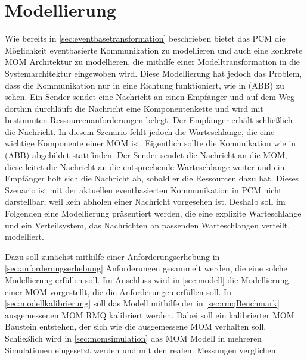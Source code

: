 
\chapter{Modellierung}
\label{ch:modellierung}
Wie bereits in \autoref{sec:eventbasetransformation} beschrieben bietet das PCM die Möglichkeit eventbasierte Kommunikation zu modellieren und auch eine konkrete MOM Architektur zu modellieren, die mithilfe einer Modelltransformation in die Systemarchitektur eingewoben wird. Diese Modellierung hat jedoch das Problem, dass die Kommunikation nur in eine Richtung funktioniert, wie in (ABB) zu sehen. Ein Sender sendet eine Nachricht an einen Empfänger und auf dem Weg dorthin durchläuft die Nachricht eine Komponentenkette und wird mit bestimmten Ressourcenanforderungen belegt. Der Empfänger erhält schließlich die Nachricht. In diesem Szenario fehlt jedoch die Warteschlange, die eine wichtige Komponente einer MOM ist. Eigentlich sollte die Komunikation wie in (ABB) abgebildet stattfinden. Der Sender sendet die Nachricht an die MOM, diese leitet die Nachricht an die entsprechende Warteschlange weiter und ein Empfänger holt sich die Nachricht ab, sobald er die Ressourcen dazu hat. Dieses Szenario ist mit der aktuellen eventbasierten Kommunikation in PCM nicht darstellbar, weil kein abholen einer Nachricht vorgesehen ist. Deshalb soll im Folgenden eine Modellierung präsentiert werden, die eine explizite Warteschlange und ein Verteilsystem, das Nachrichten an passenden Warteschlangen verteilt, modelliert.\par
Dazu soll zunächst mithilfe einer Anforderungserhebung in \autoref{sec:anforderungserhebung} Anforderungen gesammelt werden, die eine solche Modellierung erfüllen soll. Im Anschluss wird in \autoref{sec:modell} die Modellierung einer MOM vorgestellt, die die Anforderungen erfüllen soll. In \autoref{sec:modellkalibrierung} soll das Modell mithilfe der in \autoref{sec:rmqBenchmark} ausgemessenen MOM RMQ kalibriert werden. Dabei soll ein kalibrierter MOM Baustein entstehen, der sich wie die ausgemessene MOM verhalten soll. Schließlich wird in \autoref{sec:momsimulation} das MOM Modell in mehreren Simulationen eingesetzt werden und mit den realem Messungen verglichen. 


